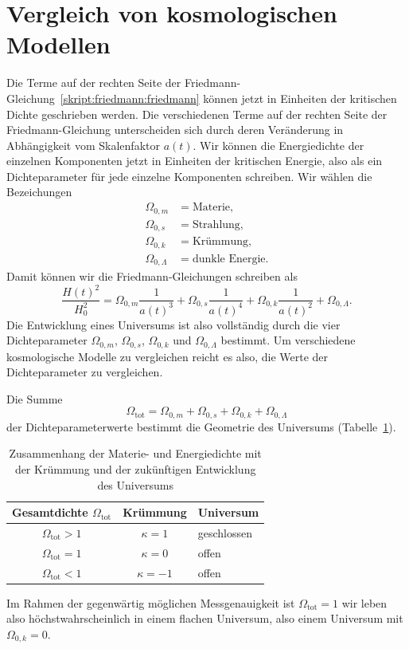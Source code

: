 \section{Vergleich von kosmologischen Modellen}
Die Terme auf der rechten Seite der
Friedmann-Gleichung~\eqref{skript:friedmann:friedmann}
können jetzt in Einheiten der kritischen Dichte geschrieben werden.
Die verschiedenen Terme auf der rechten Seite der Friedmann-Gleichung
unterscheiden sich durch deren Veränderung in Abhängigkeit vom
Skalenfaktor $a(t)$.
Wir können die Energiedichte der einzelnen Komponenten jetzt in
Einheiten der kritischen Energie, also als ein Dichteparameter
für jede einzelne Komponenten schreiben.
Wir wählen die Bezeichungen
\begin{align*}
\Omega_{0,m}&=\text{Materie},\\
\Omega_{0,s}&=\text{Strahlung},\\
\Omega_{0,k}&=\text{Krümmung},\\
\Omega_{0,\Lambda}&=\text{dunkle Energie}.
\end{align*}
Damit können wir die Friedmann-Gleichungen schreiben als
\begin{equation}
\frac{H(t)^2}{H_0^2}
=
\Omega_{0,m}\frac1{a(t)^3}
+
\Omega_{0,s}\frac1{a(t)^4}
+
\Omega_{0,k}\frac1{a(t)^2}
+
\Omega_{0,\Lambda}.
\label{skript:friedmann:omegagleichung}
\end{equation}
Die Entwicklung eines Universums ist also vollständig durch die
vier Dichteparameter 
$\Omega_{0,m}$,
$\Omega_{0,s}$,
$\Omega_{0,k}$ und
$\Omega_{0,\Lambda}$
bestimmt.
Um verschiedene kosmologische Modelle zu vergleichen reicht es also,
die Werte der Dichteparameter zu vergleichen.

Die Summe
\[
\Omega_{\text{tot}}
=
\Omega_{0,m}
+
\Omega_{0,s}
+
\Omega_{0,k}
+
\Omega_{0,\Lambda}
\]
der Dichteparameterwerte bestimmt die Geometrie des Universums
(Tabelle~\ref{skript:friedmann:tabelle}).
\begin{table}
\centering
\begin{tabular}{|c|c|l|}
\hline
Gesamtdichte $\Omega_{\text{tot}}$&Krümmung&Universum\\
\hline
$\Omega_{\text{tot}}>1$&$\kappa = 1$&geschlossen\\
$\Omega_{\text{tot}}=1$&$\kappa = 0$&offen\\
$\Omega_{\text{tot}}<1$&$\kappa =-1$&offen\\
\hline
\end{tabular}
\caption{Zusammenhang der Materie- und Energiedichte mit der Krümmung
und der zukünftigen Entwicklung des Universums
\label{skript:friedmann:tabelle}}
\end{table}
Im Rahmen der gegenwärtig möglichen Messgenauigkeit ist
$\Omega_{\text{tot}}=1$ wir leben also höchstwahrscheinlich in
einem flachen Universum, also einem Universum mit $\Omega_{0,k}=0$.

